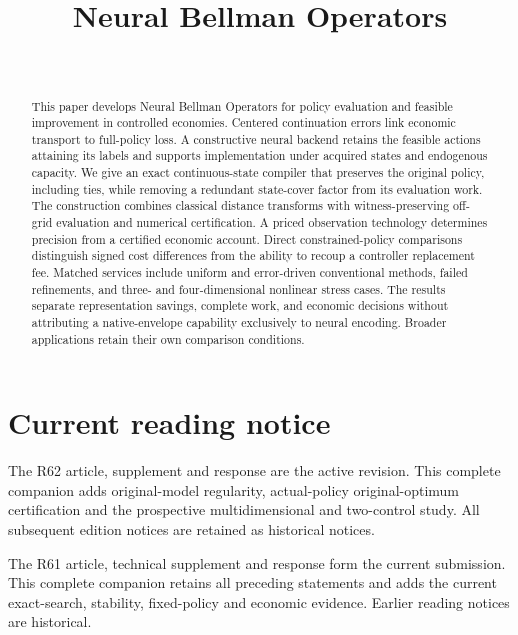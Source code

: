 \documentclass[ecta,nameyear,draft]{econsocart}
\begin{document}
\begin{frontmatter}
\title{Neural Bellman Operators}
\begin{aug}
\author[id=au1,addressref={add1}]{~}
\address[id=add1]{Peking University}
\end{aug}
\begin{abstract}
This paper develops Neural Bellman Operators for policy evaluation and feasible improvement in controlled economies. Centered continuation errors link economic transport to full-policy loss. A constructive neural backend retains the feasible actions attaining its labels and supports implementation under acquired states and endogenous capacity. We give an exact continuous-state compiler that preserves the original policy, including ties, while removing a redundant state-cover factor from its evaluation work. The construction combines classical distance transforms with witness-preserving off-grid evaluation and numerical certification. A priced observation technology determines precision from a certified economic account. Direct constrained-policy comparisons distinguish signed cost differences from the ability to recoup a controller replacement fee. Matched services include uniform and error-driven conventional methods, failed refinements, and three- and four-dimensional nonlinear stress cases. The results separate representation savings, complete work, and economic decisions without attributing a native-envelope capability exclusively to neural encoding. Broader applications retain their own comparison conditions.
\end{abstract}
\begin{keyword}
\end{keyword}
\end{frontmatter}
\section*{Current reading notice}
The R62 article, supplement and response are the active revision. This complete companion adds original-model regularity, actual-policy original-optimum certification and the prospective multidimensional and two-control study. All subsequent edition notices are retained as historical notices.

The R61 article, technical supplement and response form the current submission. This complete companion retains all preceding statements and adds the current exact-search, stability, fixed-policy and economic evidence. Earlier reading notices are historical.
\end{document}
